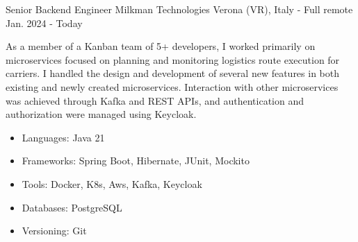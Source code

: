 

\begin{cventries}

  \cventry
    {Senior Backend Engineer} %
    {Milkman Technologies} %
    {Verona (VR), Italy - Full remote} %
    {Jan. 2024 - Today} %
    {
        As a member of a Kanban team of 5+ developers, I worked primarily on microservices focused on planning and monitoring logistics route execution for carriers. I handled the design and development of several new features in both existing and newly created microservices. Interaction with other microservices was achieved through Kafka and REST APIs, and authentication and authorization were managed using Keycloak.
        \begin{itemize}
      		\item {Languages: Java 21}
      		\item {Frameworks: Spring Boot, Hibernate, JUnit, Mockito}
            \item {Tools: Docker, K8s, Aws, Kafka, Keycloak}
      		\item {Databases: PostgreSQL}
      		\item {Versioning: Git}
      	\end{itemize}
    }


\end{cventries}
